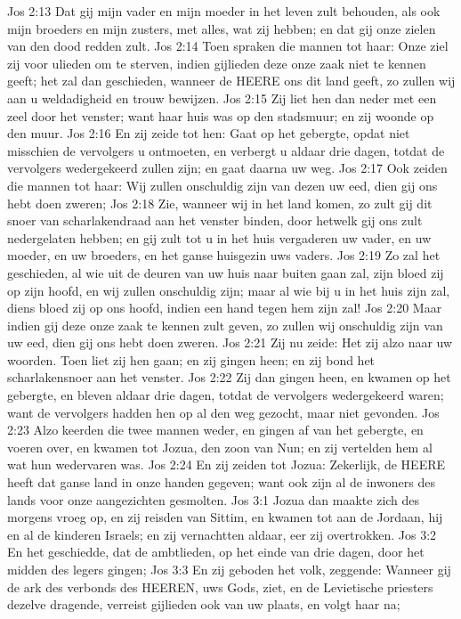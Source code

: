 Jos 2:13  Dat gij mijn vader en mijn moeder in het leven zult behouden, als ook mijn broeders en mijn zusters, met alles, wat zij hebben; en dat gij onze zielen van den dood redden zult.
Jos 2:14  Toen spraken die mannen tot haar: Onze ziel zij voor ulieden om te sterven, indien gijlieden deze onze zaak niet te kennen geeft; het zal dan geschieden, wanneer de HEERE ons dit land geeft, zo zullen wij aan u weldadigheid en trouw bewijzen.
Jos 2:15  Zij liet hen dan neder met een zeel door het venster; want haar huis was op den stadsmuur; en zij woonde op den muur.
Jos 2:16  En zij zeide tot hen: Gaat op het gebergte, opdat niet misschien de vervolgers u ontmoeten, en verbergt u aldaar drie dagen, totdat de vervolgers wedergekeerd zullen zijn; en gaat daarna uw weg.
Jos 2:17  Ook zeiden die mannen tot haar: Wij zullen onschuldig zijn van dezen uw eed, dien gij ons hebt doen zweren;
Jos 2:18  Zie, wanneer wij in het land komen, zo zult gij dit snoer van scharlakendraad aan het venster binden, door hetwelk gij ons zult nedergelaten hebben; en gij zult tot u in het huis vergaderen uw vader, en uw moeder, en uw broeders, en het ganse huisgezin uws vaders.
Jos 2:19  Zo zal het geschieden, al wie uit de deuren van uw huis naar buiten gaan zal, zijn bloed zij op zijn hoofd, en wij zullen onschuldig zijn; maar al wie bij u in het huis zijn zal, diens bloed zij op ons hoofd, indien een hand tegen hem zijn zal!
Jos 2:20  Maar indien gij deze onze zaak te kennen zult geven, zo zullen wij onschuldig zijn van uw eed, dien gij ons hebt doen zweren.
Jos 2:21  Zij nu zeide: Het zij alzo naar uw woorden. Toen liet zij hen gaan; en zij gingen heen; en zij bond het scharlakensnoer aan het venster.
Jos 2:22  Zij dan gingen heen, en kwamen op het gebergte, en bleven aldaar drie dagen, totdat de vervolgers wedergekeerd waren; want de vervolgers hadden hen op al den weg gezocht, maar niet gevonden.
Jos 2:23  Alzo keerden die twee mannen weder, en gingen af van het gebergte, en voeren over, en kwamen tot Jozua, den zoon van Nun; en zij vertelden hem al wat hun wedervaren was.
Jos 2:24  En zij zeiden tot Jozua: Zekerlijk, de HEERE heeft dat ganse land in onze handen gegeven; want ook zijn al de inwoners des lands voor onze aangezichten gesmolten.
Jos 3:1  Jozua dan maakte zich des morgens vroeg op, en zij reisden van Sittim, en kwamen tot aan de Jordaan, hij en al de kinderen Israels; en zij vernachtten aldaar, eer zij overtrokken.
Jos 3:2  En het geschiedde, dat de ambtlieden, op het einde van drie dagen, door het midden des legers gingen;
Jos 3:3  En zij geboden het volk, zeggende: Wanneer gij de ark des verbonds des HEEREN, uws Gods, ziet, en de Levietische priesters dezelve dragende, verreist gijlieden ook van uw plaats, en volgt haar na;
